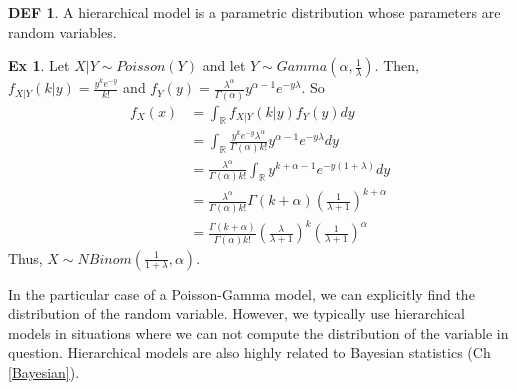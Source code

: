 \documentclass{article}
\theoremstyle{definition}\newtheorem{definition}{DEF}
\theoremstyle{definition}\newtheorem{example}{Ex}
\theoremstyle{lemma}\newtheorem{lemma}{Lemma}
\theoremstyle{corrolary}\newtheorem{corrolary}{Cor}
\begin{document}
\begin{definition}
A hierarchical model is a parametric distribution whose parameters are random variables.
\end{definition}

\begin{example}
Let $X|Y\sim Poisson(Y)$ and let $Y\sim Gamma(\alpha, \frac{1}{\lambda})$.
Then, $f_{X|Y}(k|y)=\frac{y^k e^{-y}}{k!}$ and $f_Y(y)=\frac{\lambda^\alpha}{\Gamma (\alpha )} y^{\alpha -1}e^{-y\lambda}$.
So
\begin{align*}
f_X(x)
& =\int_\mathbb{R} f_{X|Y}(k|y)f_Y(y) dy\\
&= \int_\mathbb{R} \frac{y^k e^{-y} \lambda^\alpha}{\Gamma (\alpha) k!} y^{\alpha -1} e^{-y\lambda} dy\\
&= \frac{\lambda^\alpha}{\Gamma(\alpha) k!} \int_\mathbb{R} y^{k+\alpha -1}e^{-y(1+\lambda)} dy\\
&= \frac{\lambda^\alpha}{\Gamma(\alpha) k!} \Gamma(k+ \alpha) \left(\frac{1}{\lambda +1}\right)^{k+\alpha} \\
&= \frac{\Gamma(k+\alpha)}{\Gamma(\alpha) k!} \left( \frac{\lambda}{\lambda +1}\right)^k \left( \frac{1}{\lambda +1}\right)^\alpha
\end{align*}
Thus, $X\sim NBinom(\frac{1}{1+\lambda}, \alpha)$.\\
\end{example}

In the particular case of a Poisson-Gamma model, we can explicitly find the distribution of the random variable.
However, we typically use hierarchical models in situations where we can not compute the distribution of the variable in question.
Hierarchical models are also highly related to Bayesian statistics (Ch \ref{Bayesian}).
\end{document}
